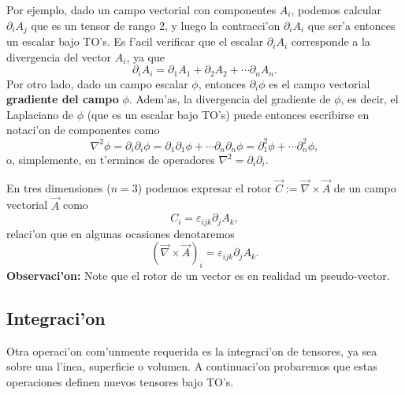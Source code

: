 Por ejemplo, dado un campo vectorial con componentes $A_i$, podemos calcular $\partial_iA_j$ que es un tensor de rango 2, y luego la contracci'on $\partial_iA_i$ que ser'a entonces un escalar bajo TO's. Es f'acil verificar que el escalar $\partial_iA_i$ corresponde a la divergencia del vector $A_i$, ya que
\begin{equation}
\partial_iA_i=\partial_1A_1+\partial_2A_2+\cdots \partial_nA_n.
\end{equation}
Por otro lado, dado un campo escalar $\phi$, entonces $\partial_i\phi$ es el campo vectorial \textbf{gradiente del campo} $\phi$. Adem'as, la divergencia del gradiente de $\phi$, es decir, el Laplaciano de $\phi$ (que es un escalar bajo TO's) puede entonces escribirse en notaci'on de componentes como
\begin{equation}
\nabla^2\phi=\partial_i\partial_i\phi=\partial_1\partial_1\phi+\cdots \partial_n\partial_n\phi=\partial^2_1\phi+\cdots \partial^2_n\phi,
\end{equation}
o, simplemente, en t'erminos de operadores $\nabla^2=\partial_i\partial_i$.

En tres dimensiones ($n=3$) podemos expresar el rotor $\vec{C}:=\vec\nabla\times\vec{A}$ de un campo vectorial $\vec{A}$ como
\begin{equation}
C_i=\varepsilon_{ijk}\partial_jA_k,
\end{equation}
relaci'on que en algunas ocasiones denotaremos 
\begin{equation}
(\vec\nabla\times\vec{A})_i=\varepsilon_{ijk}\partial_jA_k.
\end{equation}
\textbf{Observaci'on:} Note que el rotor de un vector es en realidad un pseudo-vector.

\subsection{Integraci'on}
Otra operaci'on com'unmente requerida es la integraci'on de tensores, ya sea sobre una l'inea, superficie o volumen. A continuaci'on probaremos que estas operaciones definen nuevos tensores bajo TO's.

